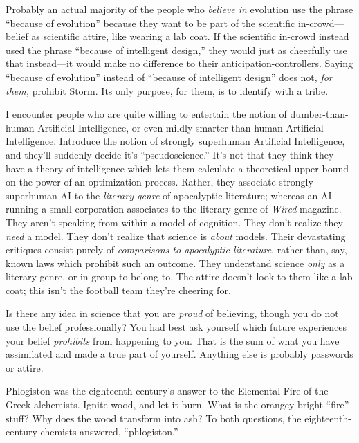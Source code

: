 {
 Probably an actual majority of the people who \textit{believe in}
evolution use the phrase ``because of
evolution'' because they want to be part of the
scientific in-crowd---belief as scientific attire, like wearing a lab
coat. If the scientific in-crowd instead used the phrase
``because of intelligent design,''
they would just as cheerfully use that instead---it would make no
difference to their anticipation-controllers. Saying
``because of evolution'' instead of
``because of intelligent design''
does not, \textit{for them,} prohibit Storm. Its only purpose, for
them, is to identify with a tribe.}

{
 I encounter people who are quite willing to entertain the notion
of dumber-than-human Artificial Intelligence, or even mildly
smarter-than-human Artificial Intelligence. Introduce the notion of
strongly superhuman Artificial Intelligence, and
they'll suddenly decide it's
``pseudoscience.''
It's not that they think they have a theory of
intelligence which lets them calculate a theoretical upper bound on the
power of an optimization process. Rather, they associate strongly
superhuman AI to the \textit{literary genre} of apocalyptic literature;
whereas an AI running a small corporation associates to the literary
genre of \textit{Wired} magazine. They aren't speaking
from within a model of cognition. They don't realize
they \textit{need} a model. They don't realize that
science is \textit{about} models. Their devastating critiques consist
purely of \textit{comparisons to apocalyptic literature}, rather than,
say, known laws which prohibit such an outcome. They understand science
\textit{only} as a literary genre, or in-group to belong to. The attire
doesn't look to them like a lab coat; this
isn't the football team they're
cheering for.}

{
 Is there any idea in science that you are \textit{proud} of
believing, though you do not use the belief professionally? You had
best ask yourself which future experiences your belief
\textit{prohibits} from happening to you. That is the sum of what you
have assimilated and made a true part of yourself. Anything else is
probably passwords or attire.}

\myendsectiontext


{
 Phlogiston was the eighteenth century's answer to
the Elemental Fire of the Greek alchemists. Ignite wood, and let it
burn. What is the orangey-bright
``fire'' stuff? Why does the wood
transform into ash? To both questions, the eighteenth-century chemists
answered, ``phlogiston.'' }


